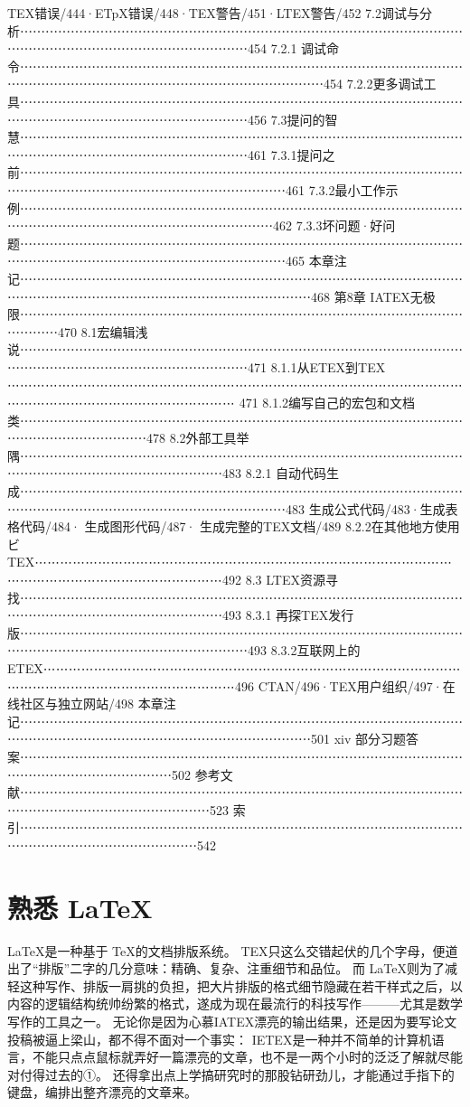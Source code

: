 \documentclass[UTF8]{ctexart}
\begin{document}
TEX错误/444·ETpX错误/448·TEX警告/451·LTEX警告/452
7.2调试与分析⋯⋯⋯⋯⋯⋯⋯⋯⋯⋯⋯⋯⋯⋯⋯⋯⋯⋯⋯⋯⋯⋯⋯⋯⋯⋯⋯⋯⋯⋯⋯⋯⋯⋯⋯⋯⋯⋯⋯⋯⋯⋯⋯⋯⋯⋯⋯⋯⋯⋯⋯⋯⋯⋯454
7.2.1 调试命令⋯⋯⋯⋯⋯⋯⋯⋯⋯⋯⋯⋯⋯⋯⋯⋯⋯⋯⋯⋯⋯⋯⋯⋯⋯⋯⋯⋯⋯⋯⋯⋯⋯⋯⋯⋯⋯⋯⋯⋯⋯⋯⋯⋯⋯⋯⋯⋯⋯⋯⋯⋯⋯⋯⋯⋯⋯⋯⋯⋯454
7.2.2更多调试工具⋯⋯⋯⋯⋯⋯⋯⋯⋯⋯⋯⋯⋯⋯⋯⋯⋯⋯⋯⋯⋯⋯⋯⋯⋯⋯⋯⋯⋯⋯⋯⋯⋯⋯⋯⋯⋯⋯⋯⋯⋯⋯⋯⋯⋯⋯⋯⋯⋯⋯⋯⋯⋯⋯456
7.3提问的智慧⋯⋯⋯⋯⋯⋯⋯⋯⋯⋯⋯⋯⋯⋯⋯⋯⋯⋯⋯⋯⋯⋯⋯⋯⋯⋯⋯⋯⋯⋯⋯⋯⋯⋯⋯⋯⋯⋯⋯⋯⋯⋯⋯⋯⋯⋯⋯⋯⋯⋯⋯⋯⋯⋯461
7.3.1提问之前⋯⋯⋯⋯⋯⋯⋯⋯⋯⋯⋯⋯⋯⋯⋯⋯⋯⋯⋯⋯⋯⋯⋯⋯⋯⋯⋯⋯⋯⋯⋯⋯⋯⋯⋯⋯⋯⋯⋯⋯⋯⋯⋯⋯⋯⋯⋯⋯⋯⋯⋯⋯⋯⋯⋯⋯⋯461
7.3.2最小工作示例⋯⋯⋯⋯⋯⋯⋯⋯⋯⋯⋯⋯⋯⋯⋯⋯⋯⋯⋯⋯⋯⋯⋯⋯⋯⋯⋯⋯⋯⋯⋯⋯⋯⋯⋯⋯⋯⋯⋯⋯⋯⋯⋯⋯⋯⋯⋯⋯⋯⋯⋯⋯⋯⋯⋯⋯462
7.3.3坏问题·好问题⋯⋯⋯⋯⋯⋯⋯⋯⋯⋯⋯⋯⋯⋯⋯⋯⋯⋯⋯⋯⋯⋯⋯⋯⋯⋯⋯⋯⋯⋯⋯⋯⋯⋯⋯⋯⋯⋯⋯⋯⋯⋯⋯⋯⋯⋯⋯⋯⋯⋯⋯⋯⋯⋯⋯⋯⋯465
本章注记⋯⋯⋯⋯⋯⋯⋯⋯⋯⋯⋯⋯⋯⋯⋯⋯⋯⋯⋯⋯⋯⋯⋯⋯⋯⋯⋯⋯⋯⋯⋯⋯⋯⋯⋯⋯⋯⋯⋯⋯⋯⋯⋯⋯⋯⋯⋯⋯⋯⋯⋯⋯⋯⋯⋯⋯⋯⋯⋯468
第8章 IATEX无极限⋯⋯⋯⋯⋯⋯⋯⋯⋯⋯⋯⋯⋯⋯⋯⋯⋯⋯⋯⋯⋯⋯⋯⋯⋯⋯⋯⋯⋯⋯⋯⋯⋯⋯⋯⋯⋯⋯⋯470
8.1宏编辑浅说⋯⋯⋯⋯⋯⋯⋯⋯⋯⋯⋯⋯⋯⋯⋯⋯⋯⋯⋯⋯⋯⋯⋯⋯⋯⋯⋯⋯⋯⋯⋯⋯⋯⋯⋯⋯⋯⋯⋯⋯⋯⋯⋯⋯⋯⋯⋯⋯⋯⋯⋯⋯⋯⋯471
8.1.1从ETEX到TEX ⋯⋯⋯⋯⋯⋯⋯⋯⋯⋯⋯⋯⋯⋯⋯⋯⋯⋯⋯⋯⋯⋯⋯⋯⋯⋯⋯⋯⋯⋯⋯⋯⋯⋯⋯⋯⋯⋯⋯⋯⋯⋯⋯⋯⋯⋯⋯⋯⋯⋯⋯⋯⋯⋯ 471
8.1.2编写自己的宏包和文档类⋯⋯⋯⋯⋯⋯⋯⋯⋯⋯⋯⋯⋯⋯⋯⋯⋯⋯⋯⋯⋯⋯⋯⋯⋯⋯⋯⋯⋯⋯⋯⋯⋯⋯⋯⋯⋯⋯⋯⋯⋯⋯⋯⋯⋯⋯478
8.2外部工具举隅⋯⋯⋯⋯⋯⋯⋯⋯⋯⋯⋯⋯⋯⋯⋯⋯⋯⋯⋯⋯⋯⋯⋯⋯⋯⋯⋯⋯⋯⋯⋯⋯⋯⋯⋯⋯⋯⋯⋯⋯⋯⋯⋯⋯⋯⋯⋯⋯⋯⋯⋯⋯483
8.2.1 自动代码生成⋯⋯⋯⋯⋯⋯⋯⋯⋯⋯⋯⋯⋯⋯⋯⋯⋯⋯⋯⋯⋯⋯⋯⋯⋯⋯⋯⋯⋯⋯⋯⋯⋯⋯⋯⋯⋯⋯⋯⋯⋯⋯⋯⋯⋯⋯⋯⋯⋯⋯⋯⋯⋯⋯⋯⋯⋯483
生成公式代码/483·生成表格代码/484·  生成图形代码/487·  生成完整的TEX文档/489
8.2.2在其他地方使用ビTEX⋯⋯⋯⋯⋯⋯⋯⋯⋯⋯⋯⋯⋯⋯⋯⋯⋯⋯⋯⋯⋯⋯⋯⋯⋯⋯⋯⋯⋯⋯⋯⋯⋯⋯⋯⋯⋯⋯⋯⋯⋯⋯⋯⋯⋯⋯⋯⋯⋯⋯492
8.3 LTEX资源寻找⋯⋯⋯⋯⋯⋯⋯⋯⋯⋯⋯⋯⋯⋯⋯⋯⋯⋯⋯⋯⋯⋯⋯⋯⋯⋯⋯⋯⋯⋯⋯⋯⋯⋯⋯⋯⋯⋯⋯⋯⋯⋯⋯⋯⋯⋯⋯⋯⋯⋯⋯⋯493
8.3.1 再探TEX发行版⋯⋯⋯⋯⋯⋯⋯⋯⋯⋯⋯⋯⋯⋯⋯⋯⋯⋯⋯⋯⋯⋯⋯⋯⋯⋯⋯⋯⋯⋯⋯⋯⋯⋯⋯⋯⋯⋯⋯⋯⋯⋯⋯⋯⋯⋯⋯⋯⋯⋯⋯⋯⋯⋯493
8.3.2互联网上的ETEX⋯⋯⋯⋯⋯⋯⋯⋯⋯⋯⋯⋯⋯⋯⋯⋯⋯⋯⋯⋯⋯⋯⋯⋯⋯⋯⋯⋯⋯⋯⋯⋯⋯⋯⋯⋯⋯⋯⋯⋯⋯⋯⋯⋯⋯⋯⋯⋯⋯⋯⋯496
CTAN/496·TEX用户组织/497·在线社区与独立网站/498
本章注记⋯⋯⋯⋯⋯⋯⋯⋯⋯⋯⋯⋯⋯⋯⋯⋯⋯⋯⋯⋯⋯⋯⋯⋯⋯⋯⋯⋯⋯⋯⋯⋯⋯⋯⋯⋯⋯⋯⋯⋯⋯⋯⋯⋯⋯⋯⋯⋯⋯⋯⋯⋯⋯⋯⋯⋯⋯⋯⋯501
xiv
部分习题答案⋯⋯⋯⋯⋯⋯⋯⋯⋯⋯⋯⋯⋯⋯⋯⋯⋯⋯⋯⋯⋯⋯⋯⋯⋯⋯⋯⋯⋯⋯⋯⋯⋯⋯⋯⋯⋯⋯⋯⋯⋯⋯⋯⋯⋯⋯⋯⋯502
参考文献⋯⋯⋯⋯⋯⋯⋯⋯⋯⋯⋯⋯⋯⋯⋯⋯⋯⋯⋯⋯⋯⋯⋯⋯⋯⋯⋯⋯⋯⋯⋯⋯⋯⋯⋯⋯⋯⋯⋯⋯⋯⋯⋯⋯⋯⋯⋯⋯⋯⋯⋯523
索引⋯⋯⋯⋯⋯⋯⋯⋯⋯⋯⋯⋯⋯⋯⋯⋯⋯⋯⋯⋯⋯⋯⋯⋯⋯⋯⋯⋯⋯⋯⋯⋯⋯⋯⋯⋯⋯⋯⋯⋯⋯⋯⋯⋯⋯⋯⋯⋯⋯⋯542

\section{熟悉 LaTeX}
\label{sec:熟悉 LaTeX}

\LaTeX 是一种基于 \TeX 的文档排版系统。
TEX只这么交错起伏的几个字母，便道出了“排版”二字的几分意味：精确、复杂、注重细节和品位。
而 \LaTeX 则为了减轻这种写作、排版一肩挑的负担，把大片排版的格式细节隐藏在若干样式之后，以内容的逻辑结构统帅纷繁的格式，遂成为现在最流行的科技写作———尤其是数学写作的工具之一。
无论你是因为心慕IATEX漂亮的输出结果，还是因为要写论文投稿被逼上梁山，都不得不面对一个事实：
IETEX是一种并不简单的计算机语言，不能只点点鼠标就弄好一篇漂亮的文章，也不是一两个小时的泛泛了解就尽能对付得过去的①。
还得拿出点上学搞研究时的那股钻研劲儿，才能通过手指下的键盘，编排出整齐漂亮的文章来。
\end{document}
